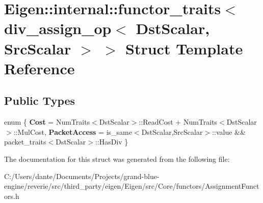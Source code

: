\hypertarget{struct_eigen_1_1internal_1_1functor__traits_3_01div__assign__op_3_01_dst_scalar_00_01_src_scalar_01_4_01_4}{}\section{Eigen\+::internal\+::functor\+\_\+traits$<$ div\+\_\+assign\+\_\+op$<$ Dst\+Scalar, Src\+Scalar $>$ $>$ Struct Template Reference}
\label{struct_eigen_1_1internal_1_1functor__traits_3_01div__assign__op_3_01_dst_scalar_00_01_src_scalar_01_4_01_4}
\subsection*{Public Types}
\begin{DoxyCompactItemize}
\item 
\mbox{\label{struct_eigen_1_1internal_1_1functor__traits_3_01div__assign__op_3_01_dst_scalar_00_01_src_scalar_01_4_01_4_a6f0983fde2cab794a5e1ce57b56eba27}} 
enum \{ {\bfseries Cost} = Num\+Traits$<$Dst\+Scalar$>$\+::Read\+Cost + Num\+Traits$<$Dst\+Scalar$>$\+::Mul\+Cost, 
{\bfseries Packet\+Access} = is\+\_\+same$<$Dst\+Scalar,Src\+Scalar$>$\+::value \&\& packet\+\_\+traits$<$Dst\+Scalar$>$\+::Has\+Div
 \}
\end{DoxyCompactItemize}


The documentation for this struct was generated from the following file\+:\begin{DoxyCompactItemize}
\item 
C\+:/\+Users/dante/\+Documents/\+Projects/grand-\/blue-\/engine/reverie/src/third\+\_\+party/eigen/\+Eigen/src/\+Core/functors/Assignment\+Functors.\+h\end{DoxyCompactItemize}
